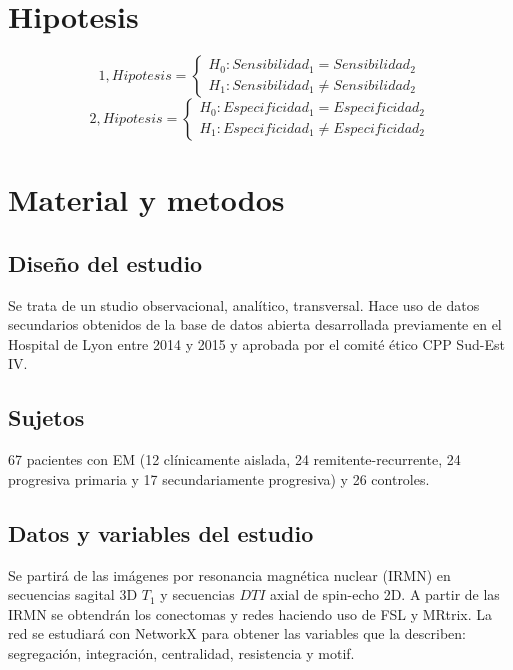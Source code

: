 \documentclass[
		portrait, %
		size=a1paper, %
		color=UICblack,
		margin=3cm,
		bannerheight=11cm
]{uicposter}
\begin{document}
\begin{multicols}{2}
\section*{Hipotesis}
\begin{highlightbox}
	\begin{equation*}
	    1, Hipotesis=
	  \begin{cases}
	      H_0: Sensibilidad_1 = Sensibilidad_2 \\
	      H_1: Sensibilidad_1 \neq Sensibilidad_2
	  \end{cases}
	\end{equation*}
	\begin{equation*}
	    2, Hipotesis=
	  \begin{cases}
		 H_0: Especificidad_1 = Especificidad_2\\
		 H_1: Especificidad_1 \neq Especificidad_2
	  \end{cases}
	\end{equation*}
\end{highlightbox}

\section*{Material y metodos}

\subsection*{Diseño del estudio}
Se trata de un studio observacional, analítico, transversal. Hace uso de datos secundarios obtenidos de la base de datos abierta desarrollada previamente en el Hospital de Lyon entre 2014 y 2015 y aprobada por el comité ético CPP Sud-Est IV.

\subsection*{Sujetos}
67 pacientes con EM (12 clínicamente aislada, 24 remitente-recurrente, 24 progresiva primaria y 17 secundariamente progresiva) y 26 controles.

\subsection*{Datos y variables del estudio}
Se partirá de las imágenes por resonancia magnética nuclear (IRMN) en secuencias sagital 3D $T_1$ y secuencias $DTI$ axial de spin-echo 2D. A partir de las IRMN se obtendrán los conectomas y redes haciendo uso de FSL y MRtrix. La red se estudiará con NetworkX para obtener las variables que la describen: segregación, integración, centralidad, resistencia y motif. 


\end{multicols}
\end{document}
